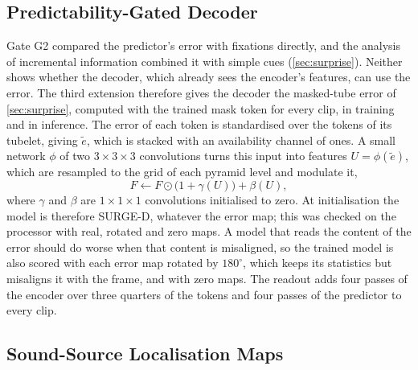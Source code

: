 \subsection{Predictability-Gated Decoder}\label{sec:pgate}

Gate G2 compared the predictor's error with fixations directly, and the
analysis of incremental information combined it with simple cues
(\cref{sec:surprise}). Neither shows whether the decoder, which already sees
the encoder's features, can use the error. The third extension therefore gives
the decoder the masked-tube error of \cref{sec:surprise}, computed with the
trained mask token for every clip, in training and in inference. The error of
each token is standardised over the tokens of its tubelet, giving $\tilde e$,
which is stacked with an availability channel of ones. A small network $\phi$ of two
$3\times3\times3$ convolutions turns this input into features
$U=\phi(\tilde e)$, which are resampled to the grid of each pyramid level and
modulate it,
\begin{equation}
  F \leftarrow F\odot\big(1+\gamma(U)\big)+\beta(U),
  \label{eq:modulation}
\end{equation}
where $\gamma$ and $\beta$ are $1\times1\times1$ convolutions initialised to
zero. At initialisation the model is therefore SURGE-D, whatever the error
map; this was checked on the processor with real, rotated and zero maps.
A model that reads the content of the error should do worse when that content
is misaligned, so the trained model is also scored with each error map rotated
by $180^{\circ}$, which keeps its statistics but misaligns it with the frame,
and with zero maps. The readout adds four passes of the encoder over three
quarters of the tokens and four passes of the predictor to every clip.

\subsection{Sound-Source Localisation Maps}\label{sec:ssl-maps}

